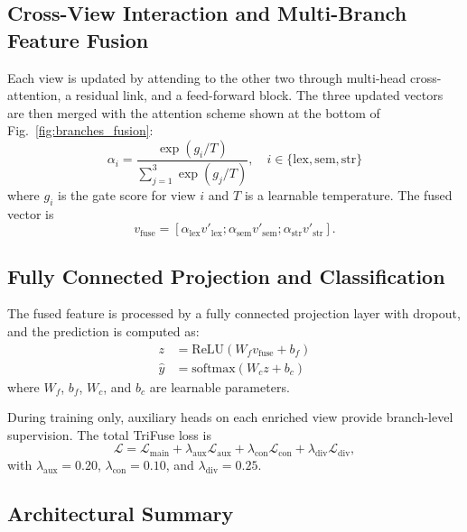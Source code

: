 \subsection{Cross-View Interaction and Multi-Branch Feature Fusion}

Each view is updated by attending to the other two through multi-head cross-attention, a residual link, and a feed-forward block. The three updated vectors are then merged with the attention scheme shown at the bottom of Fig.~\ref{fig:branches_fusion}:
\begin{equation}
\alpha_i = \frac{\exp(g_i / T)}{\sum_{j=1}^{3} \exp(g_j / T)}, \quad i \in \{\mathrm{lex}, \mathrm{sem}, \mathrm{str}\}
\end{equation}
where $g_i$ is the gate score for view $i$ and $T$ is a learnable temperature. The fused vector is
\begin{equation}
v_{\mathrm{fuse}} = [\alpha_{\mathrm{lex}} v'_{\mathrm{lex}}; \alpha_{\mathrm{sem}} v'_{\mathrm{sem}}; \alpha_{\mathrm{str}} v'_{\mathrm{str}}].
\end{equation}

\subsection{Fully Connected Projection and Classification}

The fused feature is processed by a fully connected projection layer with dropout, and the prediction is computed as:
\begin{equation}
\begin{aligned}
z &= \mathrm{ReLU}(W_f v_{\mathrm{fuse}} + b_f) \\
\hat{y} &= \mathrm{softmax}(W_c z + b_c)
\end{aligned}
\end{equation}
where $W_f$, $b_f$, $W_c$, and $b_c$ are learnable parameters.

During training only, auxiliary heads on each enriched view provide branch-level supervision. The total TriFuse loss is
\begin{equation}
\mathcal{L} = \mathcal{L}_{\mathrm{main}} + \lambda_{\mathrm{aux}}\mathcal{L}_{\mathrm{aux}} + \lambda_{\mathrm{con}}\mathcal{L}_{\mathrm{con}} + \lambda_{\mathrm{div}}\mathcal{L}_{\mathrm{div}},
\end{equation}
with $\lambda_{\mathrm{aux}}=0.20$, $\lambda_{\mathrm{con}}=0.10$, and $\lambda_{\mathrm{div}}=0.25$.

\subsection{Architectural Summary}

